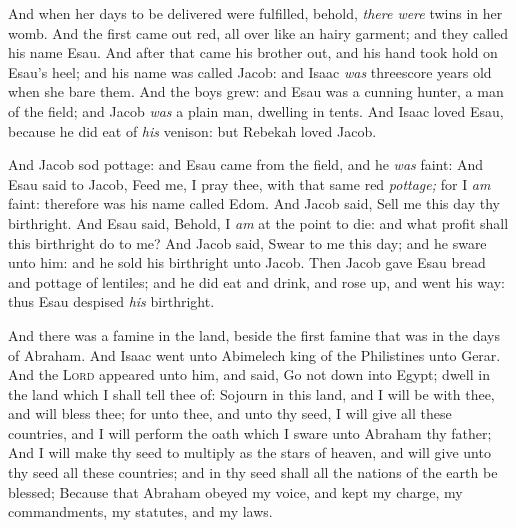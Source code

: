 \documentclass[11pt,letterpaper,oneside]{memoir}
\begin{document}
And when her days to be delivered were fulfilled, behold, \emph{there
were} twins in her womb. And the first came out red, all over like an
hairy garment; and they called his name Esau. And after that came his
brother out, and his hand took hold on Esau's heel; and his name was
called Jacob: and Isaac \emph{was} threescore years old when she bare
them. And the boys grew: and Esau was a cunning hunter, a man of the
field; and Jacob \emph{was} a plain man, dwelling in tents. And Isaac
loved Esau, because he did eat of \emph{his} venison: but Rebekah loved
Jacob.

And Jacob sod pottage: and Esau came from the field, and he \emph{was}
faint: And Esau said to Jacob, Feed me, I pray thee, with that same red
\emph{pottage;} for I \emph{am} faint: therefore was his name called
Edom. And Jacob said, Sell me this day thy birthright. And Esau said,
Behold, I \emph{am} at the point to die: and what profit shall this
birthright do to me? And Jacob said, Swear to me this day; and he sware
unto him: and he sold his birthright unto Jacob. Then Jacob gave Esau
bread and pottage of lentiles; and he did eat and drink, and rose up,
and went his way: thus Esau despised \emph{his} birthright.

And there was a famine in the land, beside the first famine that was in
the days of Abraham. And Isaac went unto Abimelech king of the
Philistines unto Gerar. And the \textsc{Lord} appeared unto him, and said,
Go not down into Egypt; dwell in the land which I shall tell thee of:
Sojourn in this land, and I will be with thee, and will bless thee; for
unto thee, and unto thy seed, I will give all these countries, and I
will perform the oath which I sware unto Abraham thy father; And I will
make thy seed to multiply as the stars of heaven, and will give unto thy
seed all these countries; and in thy seed shall all the nations of the
earth be blessed; Because that Abraham obeyed my voice, and kept my
charge, my commandments, my statutes, and my laws.
\end{document}
